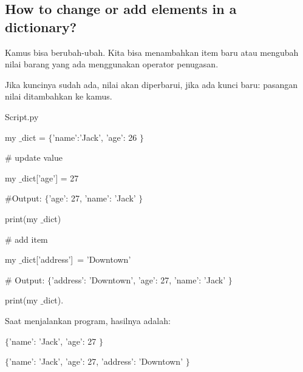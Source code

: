 \subsection*{How to change or add elements in a dictionary?}
 \par
\noindent 
Kamus bisa berubah-ubah. Kita bisa menambahkan item baru atau mengubah nilai barang yang ada menggunakan operator penugasan. \par
\noindent 
Jika kuncinya sudah ada, nilai akan diperbarui, jika ada kunci baru: pasangan nilai ditambahkan ke kamus. \par
\noindent 
Script.py \par
\noindent 
 \hspace*{0.5in} my $  \_  $dict =  $  \{  $'name':'Jack', 'age': 26 $  \}  $ \par
\vspace{12pt}
\noindent 
 \hspace*{0.5in}  $  \#  $ update value \par
\noindent 
 \hspace*{0.5in} my $  \_  $dict['age'] = 27 \par
\vspace{12pt}
\noindent 
 \hspace*{0.5in}  $  \#  $Output:  $  \{  $'age': 27, 'name': 'Jack' $  \}  $ \par
\noindent 
 \hspace*{0.5in} print(my $  \_  $dict) \par
\vspace{12pt}
\noindent 
 \hspace*{0.5in}  $  \#  $ add item \par
\noindent 
 \hspace*{0.5in} my $  \_  $dict['address']~= 'Downtown'   \par
\vspace{12pt}
\noindent 
 \hspace*{0.5in}  $  \#  $ Output:  $  \{  $'address': 'Downtown', 'age': 27, 'name': 'Jack' $  \}  $ \par
\noindent 
 \hspace*{0.5in} print(my $  \_  $dict). \par
\vspace{12pt}
\noindent 
Saat menjalankan program, hasilnya adalah: \par
\noindent 
{\fontsize{11pt}{11pt}\selectfont  $  \{  $'name': 'Jack', 'age': 27 $  \}  $} \par
\noindent 
{\fontsize{11pt}{11pt}\selectfont  $  \{  $'name': 'Jack', 'age': 27, 'address': 'Downtown' $  \}  $} \par
\vspace{12pt}
\noindent 
